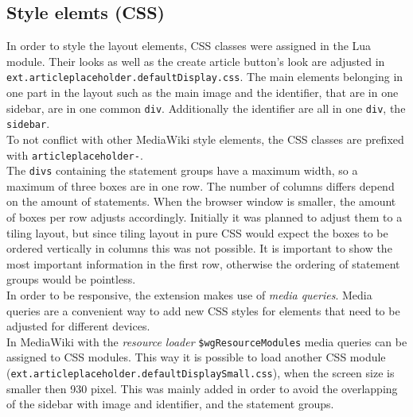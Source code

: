 \subsection{Style elemts (CSS)}

In order to style the layout elements, CSS classes were assigned in the Lua module. Their looks as well as the create article button's look are adjusted in \texttt{ext.articleplaceholder.defaultDisplay.css}. The main elements belonging in one part in the layout such as the main image and the identifier, that are in one sidebar, are in one common \texttt{div}. Additionally the identifier are all in one \texttt{div}, the \texttt{sidebar}. \\
To not conflict with other MediaWiki style elements, the CSS classes are prefixed with \texttt{\justify articleplaceholder-}. \\
The \texttt{divs} containing the statement groups have a maximum width, so a maximum of three boxes are in one row. The number of columns differs depend on the amount of statements. When the browser window is smaller, the amount of boxes per row adjusts accordingly. Initially it was planned to adjust them to a tiling layout, but since tiling layout in pure CSS would expect the boxes to be ordered vertically in columns this was not possible. It is important to show the most important information in the first row, otherwise the ordering of statement groups would be pointless. \\
In order to be responsive, the extension makes use of \textit{media queries}. Media queries are a convenient way to add new CSS styles for elements that need to be adjusted for different devices. \citep[43]{mediaquery}\\
In MediaWiki with the \textit{resource loader} \texttt{\justify \$wgResourceModules} media queries can be assigned to CSS modules. This way it is possible to load another CSS module (\texttt{\justify ext.articleplaceholder.defaultDisplaySmall.css}), when the screen size is smaller then 930 pixel. This was mainly added in order to avoid the overlapping of the sidebar with image and identifier, and the statement groups.
